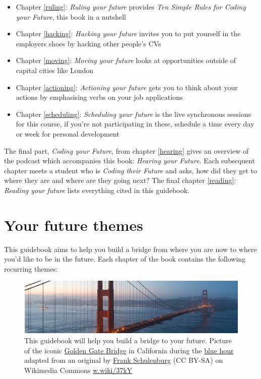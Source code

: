 \documentclass[
]{book}
\providecommand{\tightlist}{%
  \setlength{\itemsep}{0pt}\setlength{\parskip}{0pt}}
\begin{document}
\begin{itemize}
\tightlist
\item
  Chapter \ref{ruling}: \emph{Ruling your future} provides \emph{Ten Simple Rules for Coding your Future}, this book in a nutshell
\item
  Chapter \ref{hacking}: \emph{Hacking your future} invites you to put yourself in the employers shoes by hacking other people's CVs
\item
  Chapter \ref{moving}: \emph{Moving your future} looks at opportunities outside of capital cities like London
\item
  Chapter \ref{actioning}: \emph{Actioning your future} gets you to think about your actions by emphasising verbs on your job applications
\item
  Chapter \ref{scheduling}: \emph{Scheduling your future} is the live synchronous sessions for this course, if you're not participating in these, schedule a time every day or week for personal development
\end{itemize}

The final part, \emph{Coding your Future}, from chapter \ref{hearing} gives an overview of the podcast which accompanies this book: \emph{Hearing your Future}. Each subsequent chapter meets a student who is \emph{Coding their Future} and asks, how did they get to where they are and where are they going next? The final chapter \ref{reading}: \emph{Reading your future} lists everything cited in this guidebook.

\hypertarget{themes}{%
\section{Your future themes}\label{themes}}

This guidebook aims to help you build a bridge from where you are now to where you'd like to be in the future. Each chapter of the book contains the following recurring themes:

\begin{figure}

{\centering \includegraphics[width=1\linewidth]{images/goldengate} 

}

\caption{This guidebook will help you build a bridge to your future. Picture of the iconic \href{https://en.wikipedia.org/wiki/Golden_Gate_Bridge}{Golden Gate Bridge} in California during the \href{https://en.wikipedia.org/wiki/Blue_hour}{blue hour} adapted from an original by \href{https://commons.wikimedia.org/wiki/User:Frank_Schulenburg}{Frank Schulenburg} (CC BY-SA) on Wikimedia Commons \href{https://w.wiki/37kY}{w.wiki/37kY}}\label{fig:goldengate-fig}
\end{figure}
\end{document}
